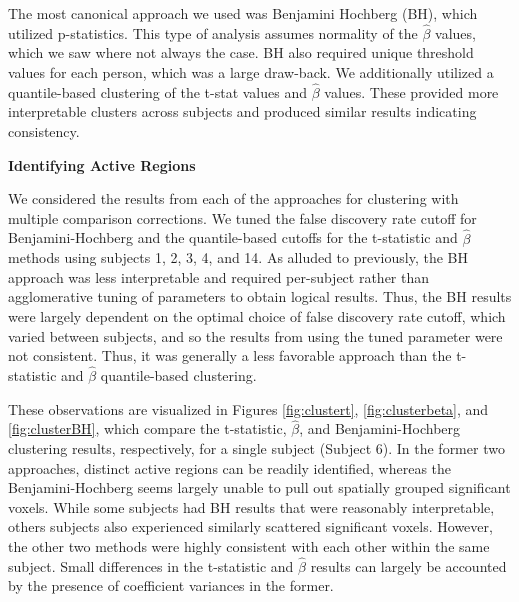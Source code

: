 The most canonical approach we used was Benjamini Hochberg (BH), which 
utilized p-statistics. This type of analysis assumes normality of the 
$\hat{\beta}$ values, which we saw where not always the case. BH also 
required unique threshold values for each person, which was a large draw-back. 
We additionally utilized a quantile-based clustering of the t-stat values and 
$\hat{\beta}$ values. These provided more interpretable clusters across 
subjects and produced similar results indicating consistency.
\vspace{5mm}

\noindent \textbf{Identifying Active Regions}

We considered the results from each of the approaches for clustering with 
multiple comparison corrections. We tuned the false discovery rate cutoff for 
Benjamini-Hochberg and the quantile-based cutoffs for the t-statistic and 
$\hat{\beta}$ methods using subjects 1, 2, 3, 4, and 14. As alluded to 
previously, the BH approach was less interpretable and required per-subject 
rather than agglomerative tuning of parameters to obtain logical results. 
Thus, the BH results were largely dependent on the optimal choice of false 
discovery rate cutoff, which varied between subjects, and so the results from 
using the tuned parameter were not consistent. Thus, it was generally a less 
favorable approach than the t-statistic and $\hat{\beta}$ quantile-based 
clustering. 

These observations are visualized in Figures \ref{fig:clustert}, 
\ref{fig:clusterbeta}, and \ref{fig:clusterBH}, which compare the t-statistic, 
$\hat{\beta}$, and Benjamini-Hochberg clustering results, respectively, for a 
single subject (Subject 6). In the former two approaches, distinct active 
regions can be readily identified, whereas the Benjamini-Hochberg seems 
largely unable to pull out spatially grouped significant voxels. While some 
subjects had BH results that were reasonably interpretable, others subjects 
also experienced similarly scattered significant voxels. However, the other 
two methods were highly consistent with each other within the same subject. 
Small differences in the t-statistic and $\hat{\beta}$ results can largely be 
accounted by the presence of coefficient variances in the former. 

